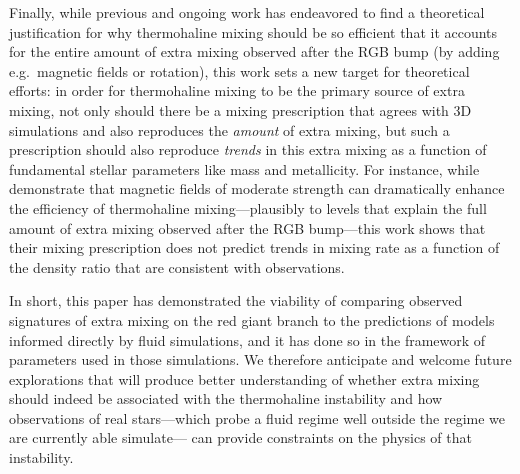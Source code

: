 Finally, while previous and ongoing work has endeavored to find a theoretical justification for why thermohaline mixing should be so efficient that it accounts for the entire amount of extra mixing observed after the RGB bump (by adding e.g.~magnetic fields or rotation), this work sets a new target for theoretical efforts: in order for thermohaline mixing to be the primary source of extra mixing, not only should there be a mixing prescription that agrees with 3D simulations and also reproduces the \textit{amount} of extra mixing, but such a prescription should also reproduce \textit{trends} in this extra mixing as a function of fundamental stellar parameters like mass and metallicity.
For instance, while \citet{harrington} demonstrate that magnetic fields of moderate strength can dramatically enhance the efficiency of thermohaline mixing---plausibly to levels that explain the full amount of extra mixing observed after the RGB bump---this work shows that their mixing prescription does not predict trends in mixing rate as a function of the density ratio that are consistent with observations.

In short, this paper has demonstrated the viability of comparing observed signatures of extra mixing on the red giant branch to the predictions of models informed directly by fluid simulations, and it has done so in the framework of parameters used in those simulations. We therefore anticipate and welcome future explorations that will produce better understanding of 
whether extra mixing should indeed be associated with the thermohaline instability and 
how observations of real stars---which probe a fluid regime well outside the regime we are currently able simulate--- can provide constraints on the physics of that instability.


